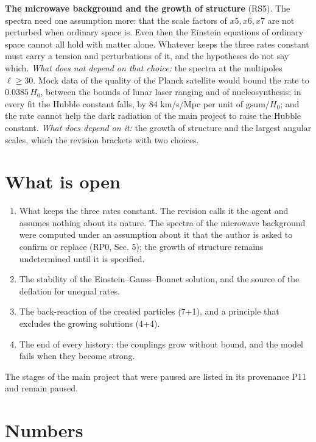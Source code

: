\documentclass[
  10pt,
]{article}
\providecommand{\tightlist}{%
  \setlength{\itemsep}{0pt}\setlength{\parskip}{0pt}}
\begin{document}
\textbf{The microwave background and the growth of structure} (RS5). The
spectra need one assumption more: that the scale factors of \(x5,x6,x7\)
are not perturbed when ordinary space is. Even then the Einstein
equations of ordinary space cannot all hold with matter alone. Whatever
keeps the three rates constant must carry a tension and perturbations of
it, and the hypotheses do not say which. \emph{What does not depend on
that choice:} the spectra at the multipoles \(\ell\ge30\). Mock data of
the quality of the Planck satellite would bound the rate to
\(0.0385\,H_0\), between the bounds of lunar laser ranging and of
nucleosynthesis; in every fit the Hubble constant falls, by 84 km/s/Mpc
per unit of \(\mathrm{gsum}/H_0\); and the rate cannot help the dark
radiation of the main project to raise the Hubble constant. \emph{What
does depend on it:} the growth of structure and the largest angular
scales, which the revision brackets with two choices.

\hypertarget{what-is-open}{%
\section{What is open}\label{what-is-open}}

\begin{enumerate}
\def\labelenumi{\arabic{enumi}.}
\tightlist
\item
  What keeps the three rates constant. The revision calls it the agent
  and assumes nothing about its nature. The spectra of the microwave
  background were computed under an assumption about it that the author
  is asked to confirm or replace (RP0, Sec. 5); the growth of structure
  remains undetermined until it is specified.
\item
  The stability of the Einstein--Gauss--Bonnet solution, and the source
  of the deflation for unequal rates.
\item
  The back-reaction of the created particles (7+1), and a principle that
  excludes the growing solutions (4+4).
\item
  The end of every history: the couplings grow without bound, and the
  model fails when they become strong.
\end{enumerate}

The stages of the main project that were paused are listed in its
provenance P11 and remain paused.

\hypertarget{numbers}{%
\section{Numbers}\label{numbers}}
\end{document}
